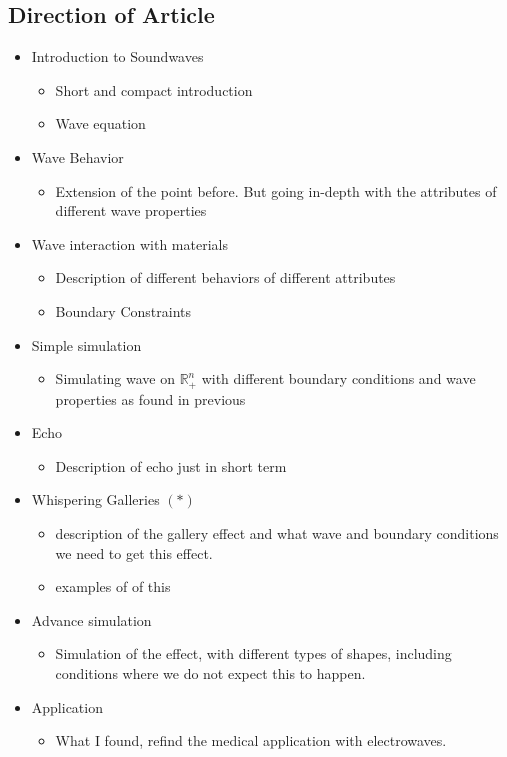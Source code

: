 \documentclass[../main.tex]{subfiles}
\begin{document}
\subsection{Direction of Article}
\begin{itemize}
    \item Introduction to Soundwaves
    \begin{itemize}
        \item Short and compact introduction
        \item Wave equation
    \end{itemize}
    \item Wave Behavior
    \begin{itemize}
        \item Extension of the point before. But going in-depth with the attributes of different wave properties
    \end{itemize}
    \item Wave interaction with materials
    \begin{itemize}
        \item Description of different behaviors of different attributes
        \item Boundary Constraints
    \end{itemize}
    \item Simple simulation
    \begin{itemize}
        \item Simulating wave on $\mathbb{R}^n_+$ with different boundary conditions and wave properties as found in previous
    \end{itemize}
    \item Echo
    \begin{itemize}
        \item Description of echo just in short term
    \end{itemize}
    \item Whispering Galleries $(*)$
    \begin{itemize}
        \item description of the gallery effect and what wave and boundary conditions we need to get this effect.
        \item examples of of this
    \end{itemize}
    \item  Advance simulation
    \begin{itemize}
        \item Simulation of the effect, with different types of shapes, including conditions where we do not expect this to happen.
    \end{itemize}
    \item Application
    \begin{itemize}
        \item What I found, refind the medical application with electrowaves.
    \end{itemize}
\end{itemize}
\end{document}
